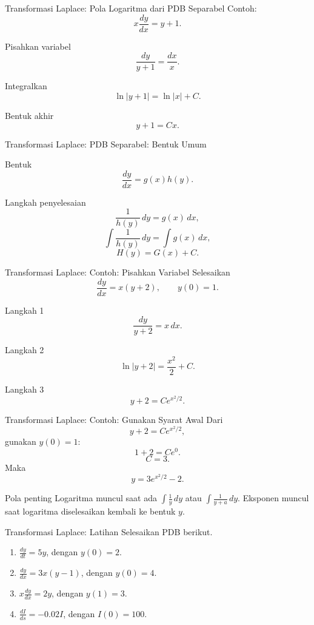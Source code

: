 \documentclass[aspectratio=169,11pt]{beamer}
\begin{document}
\begin{frame}{Transformasi Laplace: Pola Logaritma dari PDB Separabel}
Contoh:
\[
x\frac{dy}{dx}=y+1.
\]
\begin{block}{Pisahkan variabel}
\[
\frac{dy}{y+1}=\frac{dx}{x}.
\]
\end{block}
\begin{block}{Integralkan}
\[
\ln|y+1|=\ln|x|+C.
\]
\end{block}
\begin{block}{Bentuk akhir}
\[
y+1=Cx.
\]
\end{block}
\end{frame}

\begin{frame}{Transformasi Laplace: PDB Separabel: Bentuk Umum}
\begin{block}{Bentuk}
\[
\frac{dy}{dx}=g(x)h(y).
\]
\end{block}
\begin{block}{Langkah penyelesaian}
\[
\frac{1}{h(y)}\,dy=g(x)\,dx,
\]
\[
\int \frac{1}{h(y)}\,dy=\int g(x)\,dx,
\]
\[
H(y)=G(x)+C.
\]
\end{block}
\end{frame}

\begin{frame}{Transformasi Laplace: Contoh: Pisahkan Variabel}
Selesaikan
\[
\frac{dy}{dx}=x(y+2),\qquad y(0)=1.
\]
\begin{block}{Langkah 1}
\[
\frac{dy}{y+2}=x\,dx.
\]
\end{block}
\begin{block}{Langkah 2}
\[
\ln|y+2|=\frac{x^2}{2}+C.
\]
\end{block}
\begin{block}{Langkah 3}
\[
y+2=Ce^{x^2/2}.
\]
\end{block}
\end{frame}

\begin{frame}{Transformasi Laplace: Contoh: Gunakan Syarat Awal}
Dari
\[
y+2=Ce^{x^2/2},
\]
gunakan $y(0)=1$:
\[
1+2=C e^0.
\]
\[
C=3.
\]
Maka
\[
\boxed{y=3e^{x^2/2}-2.}
\]
\begin{alertblock}{Pola penting}
Logaritma muncul saat ada $\int \frac{1}{y}\,dy$ atau $\int \frac{1}{y+a}\,dy$. Eksponen muncul saat logaritma diselesaikan kembali ke bentuk $y$.
\end{alertblock}
\end{frame}

\begin{frame}{Transformasi Laplace: Latihan}
Selesaikan PDB berikut.
\begin{enumerate}
  \item $\displaystyle \frac{dy}{dt}=5y$, dengan $y(0)=2$.
  \item $\displaystyle \frac{dy}{dx}=3x(y-1)$, dengan $y(0)=4$.
  \item $\displaystyle x\frac{dy}{dx}=2y$, dengan $y(1)=3$.
  \item $\displaystyle \frac{dI}{ds}=-0.02I$, dengan $I(0)=100$.
\end{enumerate}
\end{frame}
\end{document}

